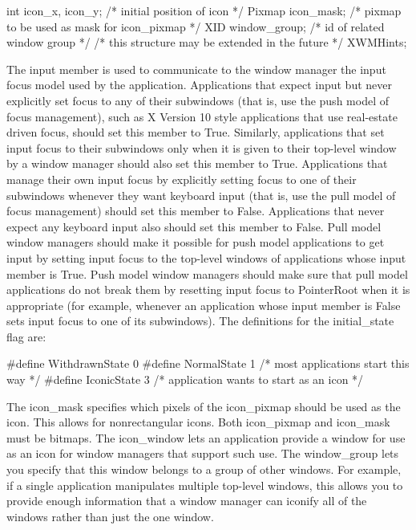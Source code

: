 \documentclass{report}
\begin{document}
\begin{itemize}
\begin{itemize}
\begin{cppcode}
{                    int icon_x, icon_y;         /* initial position of icon */
                    Pixmap icon_mask;           /* pixmap to be used as mask for icon_pixmap */
                    XID window_group;           /* id of related window group */
                    /* this structure may be extended in the future */
                } XWMHints;
            \end{cppcode}
            \bigbreak \noindent 
            The input member is used to communicate to the window manager the input focus model used by the application. Applications that expect input but never explicitly set focus to any of their subwindows (that is, use the push model of focus management), such as X Version 10 style applications that use real-estate driven focus, should set this member to True. Similarly, applications that set input focus to their subwindows only when it is given to their top-level window by a window manager should also set this member to True. Applications that manage their own input focus by explicitly setting focus to one of their subwindows whenever they want keyboard input (that is, use the pull model of focus management) should set this member to False. Applications that never expect any keyboard input also should set this member to False.
            \bigbreak \noindent 
            Pull model window managers should make it possible for push model applications to get input by setting input focus to the top-level windows of applications whose input member is True. Push model window managers should make sure that pull model applications do not break them by resetting input focus to PointerRoot when it is appropriate (for example, whenever an application whose input member is False sets input focus to one of its subwindows).
            \bigbreak \noindent 
            The definitions for the initial\_state flag are:
            \bigbreak \noindent 
            \begin{cppcode}
                #define WithdrawnState 0
                #define NormalState 1           /* most applications start this way */
                #define IconicState 3           /* application wants to start as an icon */
            \end{cppcode}
            \bigbreak \noindent 
            The icon\_mask specifies which pixels of the icon\_pixmap should be used as the icon. This allows for nonrectangular icons. Both icon\_pixmap and icon\_mask must be bitmaps. The icon\_window lets an application provide a window for use as an icon for window managers that support such use. The window\_group lets you specify that this window belongs to a group of other windows. For example, if a single application manipulates multiple top-level windows, this allows you to provide enough information that a window manager can iconify all of the windows rather than just the one window.

\end{itemize}
\end{itemize}
\end{document}
